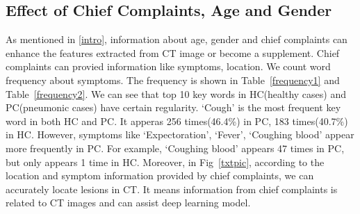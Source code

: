 \documentclass[journal]{IEEEtran}
\begin{document}
\subsection{Effect of Chief Complaints, Age and Gender}
\label{complaintsagegender}
As mentioned in \ref{intro}, information about age, gender and chief complaints can enhance the features extracted from CT image or become a supplement. Chief complaints can provied information like symptoms, location.
We count word frequency about symptoms. The frequency is shown in Table~\ref{frequency1} and Table~\ref{frequency2}. We can see that top 10 key words in HC(healthy cases) and PC(pneumonic cases) have certain regularity. `Cough' is the most frequent key word in both HC and PC. It apperas 256 times(46.4\%) in PC, 183 times(40.7\%) in HC. However, symptoms like `Expectoration', `Fever', `Coughing blood' appear more frequently in PC. For example, `Coughing blood' appears 47 times in PC, but only appears 1 time in HC. 
Moreover, in Fig~\ref{txtpic}, according to the location and symptom information provided by chief complaints, we can accurately locate lesions in CT. It means information from chief complaints is related to CT images and can assist deep learning model.
\end{document}
